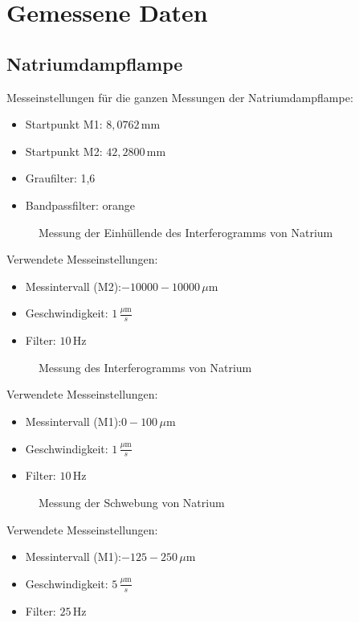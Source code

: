 \chapter{Gemessene Daten}
\section{Natriumdampflampe}
Messeinstellungen für die ganzen Messungen der Natriumdampflampe:
\begin{itemize}
    \item Startpunkt M1: $8,0762\,\text{mm}$
    \item Startpunkt M2: $42,2800\,\text{mm}$
    \item Graufilter: 1,6
    \item Bandpassfilter: orange
\end{itemize}
\begin{figure}[h]
    \centering\scalebox{1.2}{}
    \caption{Messung der Einhüllende des Interferogramms von Natrium}
\end{figure}
Verwendete Messeinstellungen:
\begin{itemize}
    \item Messintervall (M2):$-10000-10000\,\mu\text{m}$
    \item Geschwindigkeit: $1\,\frac{\mu\text{m}}{s}$
    \item Filter: $10\,\text{Hz}$
\end{itemize}\newpage
\begin{figure}[h]
    \centering\scalebox{1.2}{}
    \caption{Messung des Interferogramms von Natrium}
\end{figure}
Verwendete Messeinstellungen:
\begin{itemize}
    \item Messintervall (M1):$0-100\,\mu\text{m}$
    \item Geschwindigkeit: $1\,\frac{\mu\text{m}}{s}$
    \item Filter: $10\,\text{Hz}$
\end{itemize}\newpage
\begin{figure}[h]
    \centering\scalebox{1.2}{}
    \caption{Messung der Schwebung von Natrium}
\end{figure}
Verwendete Messeinstellungen:
\begin{itemize}
    \item Messintervall (M1):$-125-250\,\mu\text{m}$
    \item Geschwindigkeit: $5\,\frac{\mu\text{m}}{s}$
    \item Filter: $25\,\text{Hz}$
\end{itemize}\newpage
